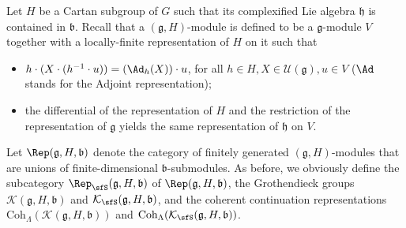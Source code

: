 \documentclass[12pt,a4paper]{amsart}
\newcommand{\CK}{{\mathcal {K}}}
\newcommand{\CU}{{\mathcal {U}}}
\newcommand{\g}{\mathfrak g}
\newcommand{\h}{\mathfrak h}
\renewcommand{\b}{\mathfrak b}
\numberwithin{equation}{section}
\theoremstyle{remark}
\def\Coh{\mathrm{Coh}}
\begin{document}
    Let $H$ be a Cartan subgroup of $G$ such that its complexified Lie algebra $\h$ is contained in $\b$. Recall that a $(\g, H)$-module is defined to be a $\g$-module $V$ together with a locally-finite representation of $H$ on it such that
     \begin{itemize}
     \item
        $h\cdot (X\cdot (h^{-1}\cdot u))=(\Ad_h(X))\cdot u$, for all $h\in H, X\in \CU(\g), u\in V$ ($\Ad$ stands for the Adjoint representation);
        \item the differential of the representation of $H$ and the restriction of the representation of $\g$ yields the same representation of $\h$ on $V$.
     \end{itemize}

Let $\Rep(\g,H,\b)$ denote the category of finitely generated $(\g, H)$-modules that  are unions of finite-dimensional $\b$-submodules.
As before, we obviously define the subcategory $\Rep_\sfS(\g,H,\b)$ of $\Rep(\g,H,\b)$,  the Grothendieck groups $\CK(\g,H, \b)$ and $\CK_\sfS(\g,H, \b)$, and the coherent continuation representations $\Coh_{\Lambda}(\CK(\g,H, \b))$ and  $\Coh_{\Lambda}(\CK_\sfS(\g,H, \b))$.
\end{document}
